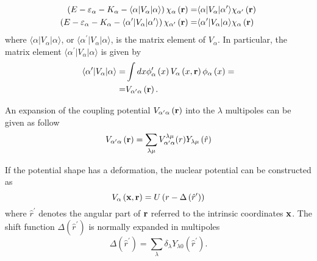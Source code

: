 \documentclass[
12pt, %
oneside, %
english, %
doublespacing, %
doublespacing, %
toctotoc, %
parskip, %
headsepline, %
]{MastersDoctoralThesis} %
\begin{document}
 \begin{align}
\left( E -\varepsilon_\alpha - K_\alpha - \langle \alpha \vert V_\alpha \vert \alpha \rangle \right) \chi_\alpha \left( {\bf r} \right) = & \langle \alpha \vert V_{\alpha} \vert \alpha^{\prime} \rangle \chi_{\alpha^{\prime}} \left( {\bf r} \right) 
\nonumber \\
\left( E -\varepsilon_\alpha - K_\alpha - \langle \alpha^{\prime} \vert V_\alpha \vert \alpha^{\prime} \rangle \right) \chi_{\alpha^{\prime}} \left( {\bf r} \right) =&  \langle \alpha^{\prime} \vert V_{\alpha} \vert \alpha \rangle \chi_{\alpha} \left( {\bf r} \right) 
 \end{align}
where $\langle \alpha \vert V_\alpha \vert \alpha \rangle$, or $\langle \alpha^{\prime} \vert V_{\alpha} \vert \alpha \rangle$, is  the matrix element of $V_\alpha$. In particular,  the matrix element $\langle \alpha^{\prime} \vert V_\alpha \vert \alpha \rangle$ is given by
\begin{align}
\langle \alpha^{\prime} \vert V_\alpha \vert \alpha \rangle = & \int d x \phi_\alpha^{\prime} \left( { x} \right)  V_\alpha \left( x,  {\bf r} \right) \phi_\alpha \left( { x} \right) =\nonumber \\
= & V_{\alpha^{\prime} \alpha} \left(  {\bf r} \right).
\end{align}

An expansion of the coupling potential $V_{\alpha^{\prime} \alpha} \left( {\bf r} \right)$ into the $\lambda$ multipoles can be given as follow
\begin{equation}
V_{\alpha^{\prime} \alpha} \left( {\bf r} \right) = \sum_{\lambda \mu} V^{\lambda \mu}_{\alpha^{\prime} \alpha} (r) Y_{\lambda \mu} \left( \hat{r} \right)
\end{equation}

If the potential shape has a deformation, the nuclear potential can be constructed as
\begin{equation}
V_\alpha \left( \bf{x}, {\bf r}\right) = U\left( r -\Delta\left( \hat{r}^{\prime} \right) \right)
\label{cc_coup_pot_def}
\end{equation}
where $\hat{r}^{\prime}$ denotes the angular part of $\bf{r}$ referred to the intrinsic coordinates $\bf{x}$. The shift function $\Delta\left( \hat{r}^{\prime} \right)$ is normally expanded in multipoles
\begin{equation}
\Delta\left( \hat{r}^{\prime} \right) = \sum_{\lambda} \delta_\lambda Y_{\lambda 0} (\hat{r}^{\prime}).
\label{cc_delta_def}
\end{equation}
\end{document}
